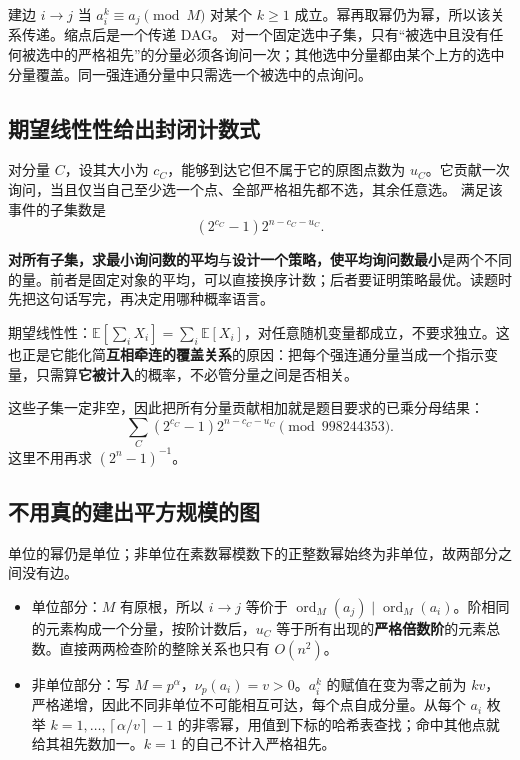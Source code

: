 \documentclass[UTF8,a4paper,11pt,twoside,openright,fontset=fandol]{ctexbook}
\theoremstyle{definition}
\newcommand{\ord}{\operatorname{ord}}
\newcommand{\ceil}[1]{\left\lceil #1\right\rceil}
\begin{document}
建边 $i\to j$ 当 $a_i^k\equiv a_j\pmod M$ 对某个 $k\ge1$ 成立。幂再取幂仍为幂，所以该关系传递。缩点后是一个传递 DAG。
对一个固定选中子集，只有“被选中且没有任何被选中的严格祖先”的分量必须各询问一次；其他选中分量都由某个上方的选中分量覆盖。同一强连通分量中只需选一个被选中的点询问。

\subsection{期望线性性给出封闭计数式}
对分量 $C$，设其大小为 $c_C$，能够到达它但不属于它的原图点数为 $u_C$。它贡献一次询问，当且仅当自己至少选一个点、全部严格祖先都不选，其余任意选。
满足该事件的子集数是
\[
 (2^{c_C}-1)2^{n-c_C-u_C}.
\]

\begin{tip}
\textbf{对所有子集，求最小询问数的平均}与\textbf{设计一个策略，使平均询问数最小}是两个不同的量。前者是固定对象的平均，可以直接换序计数；后者要证明策略最优。读题时先把这句话写完，再决定用哪种概率语言。
\end{tip}

\begin{tip}
期望线性性：$\mathbb E[\sum_iX_i]=\sum_i\mathbb E[X_i]$，对任意随机变量都成立，不要求独立。这也正是它能化简\textbf{互相牵连的覆盖关系}的原因：把每个强连通分量当成一个指示变量，只需算\textbf{它被计入}的概率，不必管分量之间是否相关。
\end{tip}

这些子集一定非空，因此把所有分量贡献相加就是题目要求的已乘分母结果：
\[
 \boxed{\sum_C(2^{c_C}-1)2^{n-c_C-u_C}\pmod{998244353}}.
\]
这里不用再求 $(2^n-1)^{-1}$。

\subsection{不用真的建出平方规模的图}
单位的幂仍是单位；非单位在素数幂模数下的正整数幂始终为非单位，故两部分之间没有边。
\begin{itemize}
\item 单位部分：$M$ 有原根，所以 $i\to j$ 等价于 $\ord_M(a_j)\mid\ord_M(a_i)$。阶相同的元素构成一个分量，按阶计数后，$u_C$ 等于所有出现的\textbf{严格倍数阶}的元素总数。直接两两检查阶的整除关系也只有 $O(n^2)$。
\item 非单位部分：写 $M=p^\alpha$，$\nu_p(a_i)=v>0$。$a_i^k$ 的赋值在变为零之前为 $kv$，严格递增，因此不同非单位不可能相互可达，每个点自成分量。从每个 $a_i$ 枚举 $k=1,\ldots,\ceil{\alpha/v}-1$ 的非零幂，用值到下标的哈希表查找；命中其他点就给其祖先数加一。$k=1$ 的自己不计入严格祖先。
\end{itemize}
\end{document}

